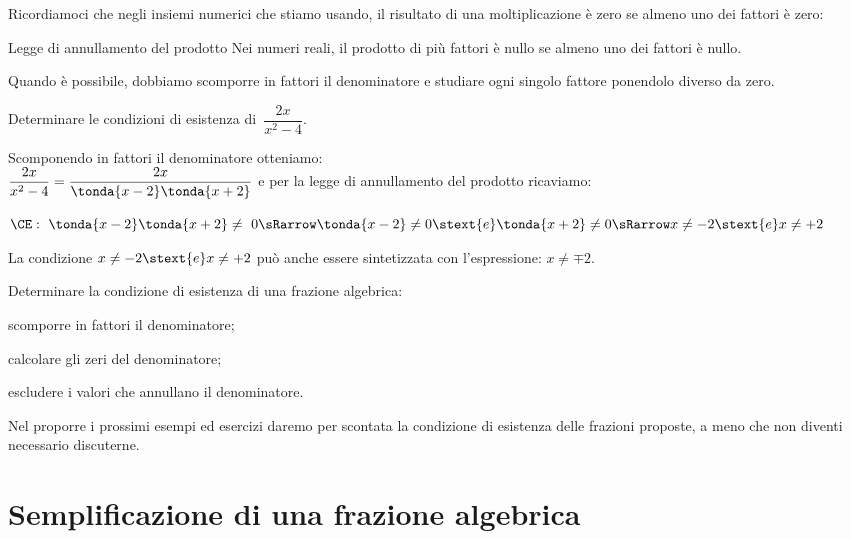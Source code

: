 Ricordiamoci che negli insiemi numerici che stiamo usando, il risultato 
di una moltiplicazione è zero se almeno uno dei fattori è zero:

\begin{teorema}{Legge di annullamento del prodotto}{}
Nei numeri reali, il prodotto di più fattori è nullo se almeno uno dei 
fattori è nullo.
\end{teorema}

Quando è possibile, dobbiamo scomporre in fattori il denominatore e studiare 
ogni singolo fattore ponendolo diverso da zero.

\begin{esempio}{}{}
Determinare le condizioni di esistenza di~\(\dfrac{2x}{x^{2}-4}\).

Scomponendo in fattori il denominatore otteniamo:\\
\(\dfrac{2x}{x^{2}-4} = \dfrac{2x}{\tonda{x-2}\tonda{x+2}}\)\quad
e per la legge di annullamento del prodotto ricaviamo:

\(\CE:~ \tonda{x-2}\tonda{x+2} \neq~0 \sRarrow 
\tonda{x-2} \neq 0 \stext{e} \tonda{x+2} \neq 0\\
\sRarrow x \neq -2 \stext{e} x \neq +2\)

La condizione \(x \neq -2 \stext{e} x \neq +2\) può anche essere sintetizzata 
con l'espressione: \(x \neq \mp 2\).
\end{esempio}

\begin{procedura}{}{}
Determinare la condizione di esistenza di una frazione algebrica:
\begin{enumeratea}
\item scomporre in fattori il denominatore;
\item calcolare gli zeri del denominatore;
\item escludere i valori che annullano il denominatore.
\end{enumeratea}
\end{procedura}

Nel proporre i prossimi esempi ed esercizi daremo per scontata la condizione 
di esistenza delle frazioni proposte, a meno che non diventi necessario 
discuterne.

\section{Semplificazione di una frazione 
algebrica}
\label{sec:frazalg_semplificazione}

